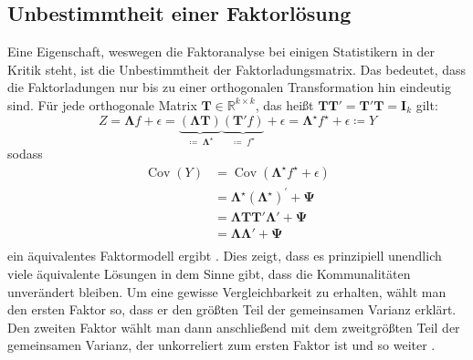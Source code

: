 \documentclass[11pt]{scrartcl}
\DeclareMathOperator{\Cov}{Cov}
\begin{document}
	\subsection{Unbestimmtheit einer Faktorlösung}
	\label{Unbestimmtheit_faktorlösung}
	Eine Eigenschaft, weswegen die Faktoranalyse bei einigen Statistikern in der Kritik steht, ist die Unbestimmtheit der Faktorladungsmatrix.
	Das bedeutet, dass die Faktorladungen nur bis zu einer
	orthogonalen Transformation hin eindeutig sind. Für jede orthogonale Matrix
	$\mathbf{T} \in \mathbb{R}^{k \times k}$, das heißt
	$\mathbf{T}\mathbf{T}' = \mathbf{T}'\mathbf{T} = \mathbf{I}_k$ gilt:
	\begin{equation}
		Z = \mathbf{\Lambda}f + \epsilon =
		\underbrace{ \left(\mathbf{\Lambda T} \right)}_{\coloneqq \; \mathbf{\Lambda}^\star}
		\underbrace{\left( \mathbf{T'}f \right)}_{\coloneqq \; f^\star} + \epsilon =
		\mathbf{\Lambda^\star}f^\star + \epsilon
		\coloneqq Y
	\end{equation}
	sodass
	\begin{equation}
		\begin{split}
			\Cov(Y) &= \Cov(\mathbf{\Lambda^\star}f^\star + \epsilon) \\
			&= \mathbf{\Lambda^\star}(\mathbf{\Lambda^\star})^{'} + \mathbf{\Psi} \\
			&= \mathbf{\Lambda T}\mathbf{T'\Lambda'} + \mathbf{\Psi} \\
			&= \mathbf{\Lambda\Lambda'} + \mathbf{\Psi} \\
		\end{split}
	\end{equation}
	ein äquivalentes Faktormodell ergibt \parencite[143-144]{Everitt.2011}. 
	Dies zeigt, dass es prinzipiell unendlich
	viele äquivalente Lösungen in dem Sinne gibt, dass die Kommunalitäten unverändert bleiben.
	Um eine gewisse Vergleichbarkeit zu erhalten, wählt man den ersten Faktor so, dass er
	den größten Teil der gemeinsamen Varianz erklärt. Den zweiten Faktor wählt man dann anschließend
	mit dem zweitgrößten Teil der gemeinsamen Varianz, der unkorreliert zum ersten Faktor ist und so weiter \parencite[vgl.][144]{Everitt.2011}.
	
	
\end{document}
